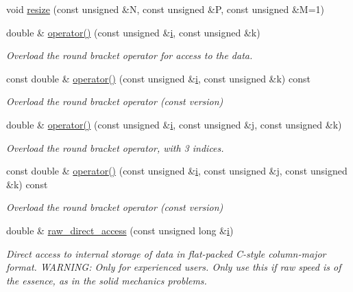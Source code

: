 \begin{DoxyCompactItemize}
void \hyperlink{classoomph_1_1DShape_a8332362ef8b25fbdad13fe2b81b5cca9}{resize} (const unsigned \&N, const unsigned \&P, const unsigned \&M=1)
\item 
double \& \hyperlink{classoomph_1_1DShape_aca7a3b5a8112835db2da558ab275d1a5}{operator()} (const unsigned \&\hyperlink{cfortran_8h_adb50e893b86b3e55e751a42eab3cba82}{i}, const unsigned \&k)
\begin{DoxyCompactList}\small\item\em Overload the round bracket operator for access to the data. \end{DoxyCompactList}\item 
const double \& \hyperlink{classoomph_1_1DShape_a661796d8dd59c34c2d9a45c580ba213c}{operator()} (const unsigned \&\hyperlink{cfortran_8h_adb50e893b86b3e55e751a42eab3cba82}{i}, const unsigned \&k) const
\begin{DoxyCompactList}\small\item\em Overload the round bracket operator (const version) \end{DoxyCompactList}\item 
double \& \hyperlink{classoomph_1_1DShape_ae9b6e45963e0c5bfb9df09e7acaf843b}{operator()} (const unsigned \&\hyperlink{cfortran_8h_adb50e893b86b3e55e751a42eab3cba82}{i}, const unsigned \&j, const unsigned \&k)
\begin{DoxyCompactList}\small\item\em Overload the round bracket operator, with 3 indices. \end{DoxyCompactList}\item 
const double \& \hyperlink{classoomph_1_1DShape_a6701a34fae38c907f2d57a292f5f6cf7}{operator()} (const unsigned \&\hyperlink{cfortran_8h_adb50e893b86b3e55e751a42eab3cba82}{i}, const unsigned \&j, const unsigned \&k) const
\begin{DoxyCompactList}\small\item\em Overload the round bracket operator (const version) \end{DoxyCompactList}\item 
double \& \hyperlink{classoomph_1_1DShape_a7974b4d85225de366759c5c96dd4e586}{raw\+\_\+direct\+\_\+access} (const unsigned long \&\hyperlink{cfortran_8h_adb50e893b86b3e55e751a42eab3cba82}{i})
\begin{DoxyCompactList}\small\item\em Direct access to internal storage of data in flat-\/packed C-\/style column-\/major format. W\+A\+R\+N\+I\+NG\+: Only for experienced users. Only use this if raw speed is of the essence, as in the solid mechanics problems. \end{DoxyCompactList}\item 

\end{DoxyCompactItemize}
